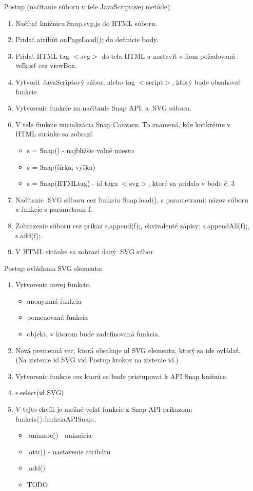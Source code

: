 Postup (načítanie súboru v tele JavaScriptovej metóde): 
\begin{enumerate}
	\item Načítať knižnicu Snap.svg.js do HTML súboru. 
	\item Pridať atribút onPageLoad(); do definicie body.
	\item Pridať HTML tag $<$svg$>$ do tela HTML a nastaviť v ňom požadovanú veľkosť cez viewBox.
	\item Vytvoriť JavaScriptový súbor, alebo tag $<$script$>$, ktorý bude obsahovať funkcie. 
	\item Vytvorenie funkcie na načítanie Snap API, a .SVG súboru. 
	\item V tele funkcie inicializácia Snap Canvasu. To znamená, kde konkrétne v HTML stránke sa zobrazí.
	\begin{itemize}
		\item s = Snap() - najbližšie voľné miesto
		\item s = Snap(šírka, výška) 
		\item s = Snap(HTMLtag) - id tagu $<$svg$>$, ktoré sa pridalo v bode č. 3
	\end{itemize}
	\item Načítanie .SVG súboru cez funkciu Snap.load(), s parametrami: názov súboru a funkcie s parametrom f. 
	\item Zobrazenie súboru cez príkaz s.append(f);, ekvivalenté zápisy: s.appendAll(f);, s.add(f);. 
	\item V HTML stránke sa zobrazí daný .SVG súbor. 
	
	
\end{enumerate}

Postup ovládania SVG elementu:

\begin{enumerate}
	\item Vytvorenie novej funkcie. 
	\begin{itemize}
		\item anonymná funkcia 
		\item pomenovaná funkcia
		\item objekt, v ktorom bude zadefinovaná funkcia. 
	\end{itemize}
	\item Nová premenná var, ktorá obsahuje id SVG elementu, ktorý sa ide ovládať. (Na zistenie id SVG vid Postup krokov na zistenie id.)
	\item Vytvorenie funkcie cez ktorú sa bude pristupovať k API Snap knižnice. 
	\item s.select(id SVG)
	\item V tejto chvíli je možné volať funkcie z Snap API príkazom: funkcia().funkciaAPISnap.. 
	\begin{itemize}
		\item .animate() - animácia
		\item .attr() - nastavenie atribútu
		\item .add() 
		\item TODO
		\
	\end{itemize}
	
	
	
\end{enumerate}


